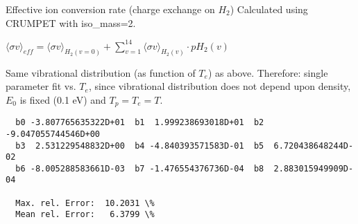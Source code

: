 \documentclass[12pt,dvipdfmx]{article}
\begin{document}
  Effective ion conversion rate (charge exchange on $H_2$) Calculated using CRUMPET with iso_mass=2.

  $ \langle\sigma v \rangle_{eff} = \langle\sigma v \rangle_{H_2(v=0)} + \sum_{v=1}^{14}
\langle\sigma v \rangle_{H_2(v)} \cdot pH_2(v) $

  Same vibrational distribution (as function of $T_e$) as above.
  Therefore:
  single parameter fit vs. $T_e$,
  since vibrational distribution does not depend upon density, $E_0$ is fixed
  (0.1 eV) and $T_p = T_e = T$.

\begin{small}\begin{verbatim}
  b0 -3.807765635322D+01  b1  1.999238693018D+01  b2 -9.047055744546D+00
  b3  2.531229548832D+00  b4 -4.840393571583D-01  b5  6.720438648244D-02
  b6 -8.005288583661D-03  b7 -1.476554376736D-04  b8  2.883015949909D-04

  Max. rel. Error:  10.2031 \%
  Mean rel. Error:   6.3799 \%

\end{verbatim}\end{small}
\newpage
\end{document}
